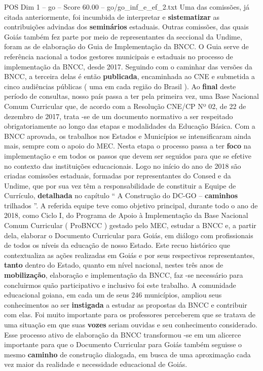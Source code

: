 \begin{textsample}{POS Dim 1 – go – Score 60.00 – go/go\_inf\_e\_ef\_2.txt}
Uma das comissões, já citada anteriormente, foi incumbida de interpretar e \textbf{sistematizar} as contribuições advindas dos \textbf{seminários} estaduais.
Outras comissões, das quais Goiás também fez parte por meio de representantes da seccional da Undime, foram as de elaboração do Guia de Implementação da BNCC.
O Guia serve de referência nacional a todos gestores municipais e estaduais no processo de implementação da BNCC, desde 2017.
Seguindo com o caminhar das versões da BNCC, a terceira delas é então \textbf{publicada}, encaminhada ao CNE e submetida a cinco audiências públicas ( uma em cada região do Brasil ).
Ao \textbf{final} deste período de consultas, nosso país passa a ter pela primeira vez, uma Base Nacional Comum Curricular que, de acordo com a Resolução CNE/CP Nº 02, de 22 de dezembro de 2017, trata -se de um documento normativo a ser respeitado obrigatoriamente ao longo das etapas e modalidades da Educação Básica.
Com a BNCC aprovada, os trabalhos nos Estados e Municípios se intensificaram ainda mais, sempre com o apoio do MEC.
Nesta etapa o processo passa a ter \textbf{foco} na implementação e em todos os passos que devem ser seguidos para que se efetive no contexto das instituições educacionais.
Logo no início do ano de 2018 são criadas comissões estaduais, formadas por representantes do Consed e da Undime, que por sua vez têm a responsabilidade de constituir a Equipe de Currículo, \textbf{detalhada} no capítulo “ A Construção do DC-GO – \textbf{caminhos} trilhados ”.
A referida equipe teve como objetivo principal, durante todo o ano de 2018, como Ciclo I, do Programa de Apoio à Implementação da Base Nacional Comum Curricular ( ProBNCC ) gestado pelo MEC, estudar a BNCC e, a partir dela, elaborar o Documento Curricular para Goiás, em diálogo com profissionais de todos os níveis da educação de nosso Estado.
Este recuo histórico que contextualiza as ações realizadas em Goiás e por seus respectivos representantes, \textbf{tanto} dentro do Estado, quanto em nível nacional, nestes três anos de \textbf{mobilização}, elaboração e implementação da BNCC, faz -se necessário para concluirmos quão participativo e inclusivo foi este trabalho.
A comunidade educacional goiana, em cada um de seus 246 municípios, ampliou seus conhecimentos ao ser \textbf{instigada} a estudar as propostas da BNCC e contribuir com elas.
Foi muito importante para os professores perceberem que se tratava de uma situação em que suas \textbf{vozes} seriam ouvidas e seu conhecimento considerado.
Esse processo ativo de elaboração da BNCC transformou -se em um alicerce importante para que o Documento Curricular para Goiás também seguisse o mesmo \textbf{caminho} de construção dialogada, em busca de uma aproximação cada vez maior da realidade e necessidade educacional de Goiás.

\end{textsample}
